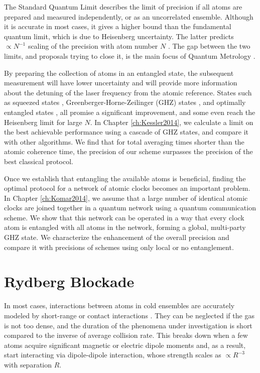 The Standard Quantum Limit describes the limit of precision if all atoms are
prepared and measured independently, or as an uncorrelated ensemble. Although it
is accurate in most cases, it gives a higher bound than the fundamental quantum
limit, which is due to Heisenberg uncertainty. The latter predicts $\propto
N^{-1}$ scaling of the precision with atom number $N$ \cite{Hall2012}. The gap
between the two limits, and proposals trying to close it, is the main focus of
Quantum Metrology \cite{Giovanetti2011, Escher:2011fn}.

By preparing the collection of atoms in an
entangled state, the subsequent measurement will have lower uncertainty and will
provide more information about the detuning of the laser frequency from the
atomic reference. States such as squeezed states \cite{Andre2004,
Borregaard2013_nearHeisenberg}, Greenberger-Horne-Zeilinger (GHZ) states
\cite{Wineland1998, Bollinger1996}, and optimally entangled states
\cite{Buzek1999, Berry2009}, all promise a significant improvement, and some
even reach the Heisenberg limit for large $N$. In Chapter \ref{ch:Kessler2014},
we calculate a limit on the best achievable performance using a cascade of GHZ
states, and compare it with other algorithms. We find that for total
averaging times shorter than the atomic coherence time, the precision of our
scheme surpasses the precision of the best classical protocol.

Once we establish that entangling the available atoms is beneficial, finding the
optimal protocol for a network of atomic clocks becomes an important problem. In
Chapter \ref{ch:Komar2014}, we assume that a large number of identical atomic
clocks are joined together in a quantum network using a quantum communication
scheme. We show that this network can be operated in a way that every clock
atom is entangled with all atoms in the network, forming a global, multi-party
GHZ state. We characterize the enhancement of the overall precision and compare
it with precisions of schemes using only local or no entanglement.





\section{Rydberg Blockade}
In most cases, interactions between atoms in cold ensembles are accurately
modeled by short-range or contact interactions \cite{Cheng2010}.
They can be neglected if the gas is not too dense, and the duration of the
phenomena under investigation is short compared to the inverse of average
collision rate. This breaks down when a few atoms acquire significant magnetic
or electric dipole moments and, as a result, start interacting via dipole-dipole
interaction, whose strength scales as $\propto R^{-3}$ with separation $R$.

